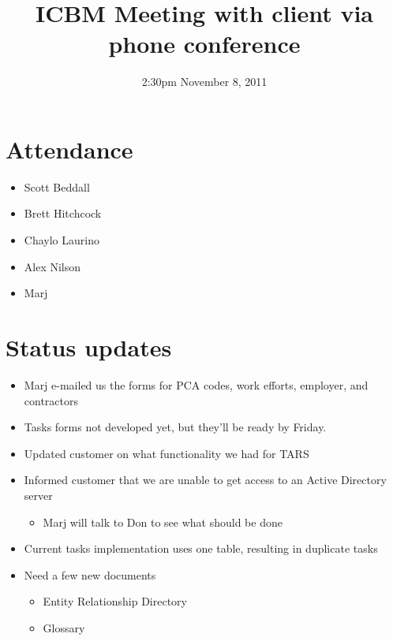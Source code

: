 \documentclass{article}
\begin{document}
\title{ICBM Meeting with client via phone conference}
\date{2:30pm November 8, 2011}
\maketitle

\section{Attendance}
\begin{itemize}
\item Scott Beddall
\item Brett Hitchcock
\item Chaylo Laurino
\item Alex Nilson
\item Marj
\end{itemize}

\section{Status updates}
\begin{itemize}
\item Marj e-mailed us the forms for PCA codes, work efforts, employer, and contractors
\item Tasks forms not developed yet, but they'll be ready by Friday.
\item Updated customer on what functionality we had for TARS
\item Informed customer that we are unable to get access to an Active Directory server
	\begin{itemize}
	\item Marj will talk to Don to see what should be done
	\end{itemize}
\item Current tasks implementation uses one table, resulting in duplicate tasks
\item Need a few new documents
	\begin{itemize}
	\item Entity Relationship Directory
	\item Glossary
	\end{itemize}
\end{itemize}
\end{document}
